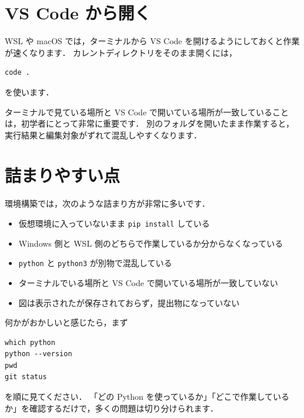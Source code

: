 \section{VS Code から開く}

WSL や macOS では，ターミナルから VS Code を開けるようにしておくと作業が速くなります．
カレントディレクトリをそのまま開くには，

\begin{lstlisting}[style=codecell]
code .
\end{lstlisting}

を使います．

ターミナルで見ている場所と VS Code で開いている場所が一致していることは，初学者にとって非常に重要です．
別のフォルダを開いたまま作業すると，実行結果と編集対象がずれて混乱しやすくなります．


\section{詰まりやすい点}

環境構築では，次のような詰まり方が非常に多いです．

\begin{itemize}
\item 仮想環境に入っていないまま \texttt{pip install} している
\item Windows 側と WSL 側のどちらで作業しているか分からなくなっている
\item \texttt{python} と \texttt{python3} が別物で混乱している
\item ターミナルでいる場所と VS Code で開いている場所が一致していない
\item 図は表示されたが保存されておらず，提出物になっていない
\end{itemize}

何かがおかしいと感じたら，まず
\begin{lstlisting}[style=codecell]
which python
python --version
pwd
git status
\end{lstlisting}
を順に見てください．
「どの Python を使っているか」「どこで作業しているか」を確認するだけで，多くの問題は切り分けられます．
